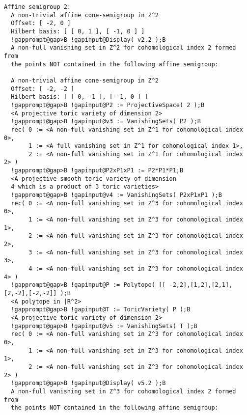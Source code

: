 \documentclass[a4paper,11pt]{report}
\begin{document}
{{\begin{Verbatim}[commandchars=!@B,fontsize=\small,frame=single,label=Example]
  Affine semigroup 2: 
  A non-trivial affine cone-semigroup in Z^2
  Offset: [ -2, 0 ]
  Hilbert basis: [ [ 0, 1 ], [ -1, 0 ] ]
  !gapprompt@gap>B !gapinput@Display( v2.2 );B
  A non-full vanishing set in Z^2 for cohomological index 2 formed from 
  the points NOT contained in the following affine semigroup: 
  
  A non-trivial affine cone-semigroup in Z^2
  Offset: [ -2, -2 ]
  Hilbert basis: [ [ 0, -1 ], [ -1, 0 ] ]
  !gapprompt@gap>B !gapinput@P2 := ProjectiveSpace( 2 );B
  <A projective toric variety of dimension 2>
  !gapprompt@gap>B !gapinput@v3 := VanishingSets( P2 );B
  rec( 0 := <A non-full vanishing set in Z^1 for cohomological index 0>,
       1 := <A full vanishing set in Z^1 for cohomological index 1>,
       2 := <A non-full vanishing set in Z^1 for cohomological index 2> )
  !gapprompt@gap>B !gapinput@P2xP1xP1 := P2*P1*P1;B
  <A projective smooth toric variety of dimension
  4 which is a product of 3 toric varieties>
  !gapprompt@gap>B !gapinput@v4 := VanishingSets( P2xP1xP1 );B
  rec( 0 := <A non-full vanishing set in Z^3 for cohomological index 0>,
       1 := <A non-full vanishing set in Z^3 for cohomological index 1>,
       2 := <A non-full vanishing set in Z^3 for cohomological index 2>,
       3 := <A non-full vanishing set in Z^3 for cohomological index 3>,
       4 := <A non-full vanishing set in Z^3 for cohomological index 4> )
  !gapprompt@gap>B !gapinput@P := Polytope( [[ -2,2],[1,2],[2,1],[2,-2],[-2,-2]] );B
  <A polytope in |R^2>
  !gapprompt@gap>B !gapinput@T := ToricVariety( P );B
  <A projective toric variety of dimension 2>
  !gapprompt@gap>B !gapinput@v5 := VanishingSets( T );B
  rec( 0 := <A non-full vanishing set in Z^3 for cohomological index 0>,
       1 := <A non-full vanishing set in Z^3 for cohomological index 1>,
       2 := <A non-full vanishing set in Z^3 for cohomological index 2> )
  !gapprompt@gap>B !gapinput@Display( v5.2 );B
  A non-full vanishing set in Z^3 for cohomological index 2 formed from 
  the points NOT contained in the following affine semigroup: 
  

\end{Verbatim}}}
\end{document}
